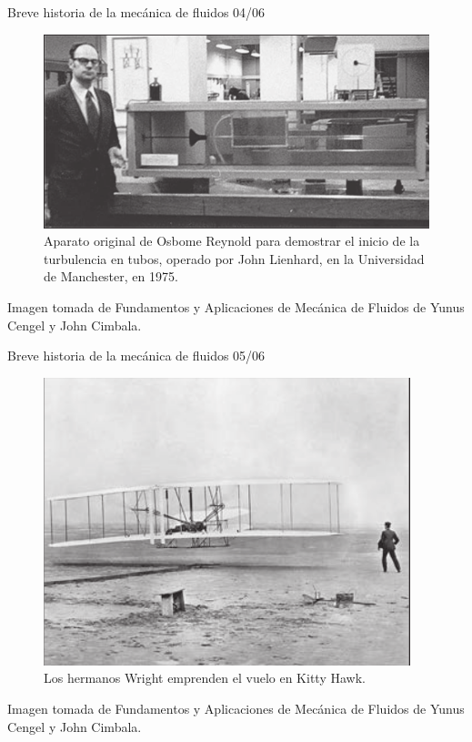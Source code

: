 \begin{frame}{Breve historia de la mecánica de fluidos 04/06}
\justifying
\begin{figure}[H]
\centering
\includegraphics[scale=0.25]{Section_Files/imagenes/sec01_0101_Fig01-14.png}
\caption{Aparato original de Osbome Reynold para demostrar el inicio de la turbulencia en tubos, operado por John Lienhard, en la Universidad de Manchester, en 1975.}
\label{fig: Figura1-14}
\end{figure}
Imagen tomada de Fundamentos y Aplicaciones de Mecánica de Fluidos de Yunus Cengel y John Cimbala.
\end{frame}
	
\begin{frame}{Breve historia de la mecánica de fluidos 05/06}
\justifying
\begin{figure}[H]
\centering
\includegraphics[scale=0.25]{Section_Files/imagenes/sec01_0101_Fig01-15.png}
\caption{Los hermanos Wright emprenden el vuelo en Kitty Hawk.}
\label{fig: Figura1-15}
\end{figure}
Imagen tomada de Fundamentos y Aplicaciones de Mecánica de Fluidos de Yunus Cengel y John Cimbala.
\end{frame}


